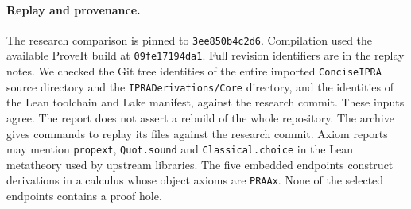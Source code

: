 \paragraph{Replay and provenance.}
The research comparison is pinned to \texttt{3ee850b4c2d6}. Compilation used the available ProveIt build at \texttt{09fe17194da1}. Full revision identifiers are in the replay notes. We checked the Git tree identities of the entire imported \texttt{ConciseIPRA} source directory and the \texttt{IPRADerivations/Core} directory, and the identities of the Lean toolchain and Lake manifest, against the research commit. These inputs agree. The report does not assert a rebuild of the whole repository. The archive gives commands to replay its files against the research commit. Axiom reports may mention \texttt{propext}, \texttt{Quot.sound} and \texttt{Classical.choice} in the Lean metatheory used by upstream libraries. The five embedded endpoints construct derivations in a calculus whose object axioms are \texttt{PRAAx}. None of the selected endpoints contains a proof hole.

